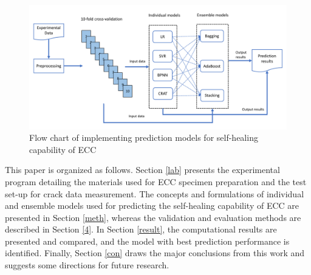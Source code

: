 \documentclass[11pt]{article}
\begin{document}
	
	\begin{figure}	
		\begin{center}
			\includegraphics[width=\textwidth]{structure.pdf}
		\end{center}
		\caption{Flow chart of implementing prediction models for self-healing capability of ECC}
		\label{fig:structure}
	\end{figure}
	
	
	This paper is organized as follows.  Section \ref{lab} presents the experimental program detailing the materials used for ECC specimen preparation and the test set-up for crack data measurement. The concepts and formulations of individual and ensemble models used for predicting the self-healing capability of ECC are presented in Section \ref{meth}, whereas the validation and evaluation methods are described in Section \ref{4}. In Section \ref{result}, the computational results are presented and compared, and the model with best prediction performance is identified. Finally, Section \ref{con} draws the major conclusions from this work and suggests some directions for future research.
	
\end{document}
